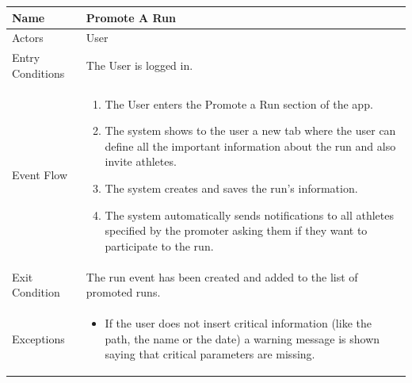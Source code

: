 \begin{enumerate}
\FloatBarrier
\begin{table}[h]
\begin{tabular}{|l|p{}|}
\hline
Name             & Promote A Run \\ \hline
Actors           & User  \\ \hline
Entry Conditions & The User is logged in.    \\ \hline
Event Flow       & \begin{enumerate}
            \item The User enters the Promote a Run section of the app.
            \item The system shows to the user a new tab where the user can define all the important information about the run and also invite athletes.
            \item The system creates and saves the run's information.
            \item The system automatically sends notifications to all athletes specified by the promoter asking them if they want to participate to the run.
        \end{enumerate}\\ \hline
Exit Condition   & The run event has been created and added to the list of promoted runs.\\ \hline
Exceptions       & \begin{itemize}
\item If the user does not insert critical information (like the path, the name or the date) a warning message is shown saying that critical parameters are missing.
\end{itemize}\\ \hline
\end{tabular}
\end{table}
\FloatBarrier


\end{enumerate}
